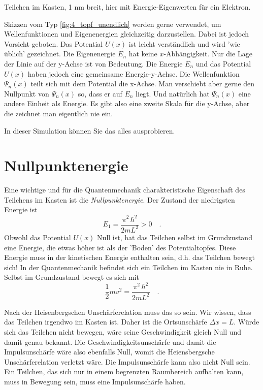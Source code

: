 \begin{marginfigure}
    \caption{Teilchen im Kasten, 1 nm breit, hier mit Energie-Eigenwerten für ein Elektron.}
    \label{fig:4_topf_unendlich}
\end{marginfigure}

Skizzen vom Typ \ref{fig:4_topf_unendlich} werden gerne verwendet, um Wellenfunktionen und Eigenenergien gleichzeitig darzustellen. Dabei ist jedoch Vorsicht geboten. Das Potential $U(x)$ ist leicht verständlich und wird 'wie üblich' gezeichnet. Die Eigenenergie $E_n$ hat keine $x$-Abhängigkeit. Nur die Lage der Linie auf der y-Achse ist von Bedeutung. Die Energie $E_n$ und das Potential $U(x)$ haben jedoch eine gemeinsame Energie-y-Achse. Die Wellenfunktion $\Psi_n(x)$ teilt sich mit dem Potential die x-Achse. Man verschiebt aber gerne den Nullpunkt von $\Psi_n(x)$ so, dass er auf $E_n$ liegt. Und natürlich hat $\Psi_n(x)$ eine andere Einheit als Energie. Es gibt also eine zweite Skala für die y-Achse, aber die zeichnet man eigentlich nie ein.


\begin{questions}
    \item In dieser Simulation können Sie das alles ausprobieren. 
\end{questions}

\section{Nullpunktenergie}

Eine wichtige und für die Quantenmechanik charakteristische Eigenschaft des Teilchens im Kasten ist die \emph{Nullpunktenergie}. Der Zustand der niedrigsten Energie ist 
\begin{equation}
    E_1 = \frac{\pi^2 \, \hbar^2}{2 m L^2} > 0 \quad .
\end{equation}
Obwohl das Potential $U(x)$ Null ist, hat das Teilchen selbst im Grundzustand eine Energie, die etwas höher ist als der 'Boden' des Potentialtopfes. Diese Energie muss in der kinetischen Energie enthalten sein, d.h. das Teilchen bewegt sich! In der Quantenmechanik befindet sich ein Teilchen im Kasten nie in Ruhe. Selbst im Grundzustand bewegt es sich mit 
\begin{equation}
    \frac{1}{2} m v^2 = \frac{\pi^2 \, \hbar^2}{2 m L^2}  \quad .
\end{equation}

Nach der Heisenbergschen Unschärferelation muss das so sein. Wir wissen, dass das Teilchen irgendwo im Kasten ist. Daher ist die Ortsunschärfe $\Delta x = L$. Würde sich das Teilchen nicht bewegen, wäre seine Geschwindigkeit gleich Null und damit genau bekannt. Die Geschwindigkeitsunschärfe und damit die Impulsunschärfe wäre also ebenfalls Null, womit die Heiensbergsche Unschärferelation verletzt wäre. 
Die Impulsunschärfe kann also nicht Null sein. Ein Teilchen, das sich nur in einem begrenzten Raumbereich aufhalten kann, muss in Bewegung sein, muss eine Impulsunschärfe haben.


